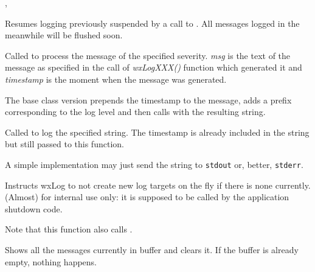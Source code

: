 
,\\

\label{wxlogresume}


Resumes logging previously suspended by a call to
. All messages logged in the meanwhile will be
flushed soon.

\label{wxlogdolog}


Called to process the message of the specified severity. {\it msg} is the text
of the message as specified in the call of {\it wxLogXXX()} function which
generated it and {\it timestamp} is the moment when the message was generated.

The base class version prepends the timestamp to the message, adds a prefix
corresponding to the log level and then calls
 with the resulting string.

\label{wxlogdologstring}


Called to log the specified string. The timestamp is already included in the
string but still passed to this function.

A simple implementation may just send the string to {\tt stdout} or, better,
{\tt stderr}.

\label{wxlogdontcreateondemand}


Instructs wxLog to not create new log targets on the fly if there is none
currently. (Almost) for internal use only: it is supposed to be called by the
application shutdown code.

Note that this function also calls
.

\label{wxlogflush}


Shows all the messages currently in buffer and clears it. If the buffer
is already empty, nothing happens.

